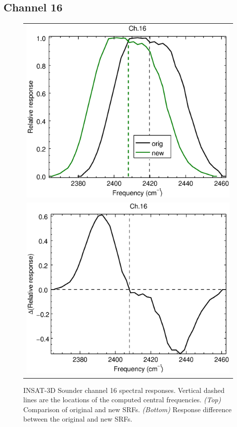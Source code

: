 \subsection{Channel 16}
\begin{figure}[H]
  \centering
  \begin{tabular}{c}
    \includegraphics[scale=0.55]{graphics/sndr/srf/sndr_insat3d-16.eps} \\
    \includegraphics[scale=0.55]{graphics/sndr/srf/sndr_insat3d-16.difference.eps}
  \end{tabular}
  \caption{INSAT-3D Sounder channel 16 spectral responses. Vertical dashed lines are the locations of the computed central frequencies. \emph{(Top)} Comparison of original and new SRFs. \emph{(Bottom)} Response difference between the original and new SRFs.}
  \label{fig:sndr_ch16}
\end{figure}

